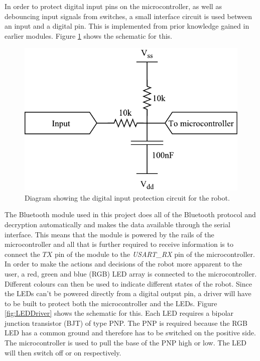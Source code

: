 In order to protect digital input pins on the microcontroller, as well as debouncing input signals from switches, a small interface circuit is used between an input and a digital pin. This is implemented from prior knowledge gained in earlier modules. Figure \ref{fig:InputProtection} shows the schematic for this.

\begin{figure}[H]
\centering
\includegraphics[scale = 1]{pics/InputProtection.pdf}
\caption{Diagram showing the digital input protection circuit for the robot.}
\label{fig:InputProtection}
\end{figure}

The Bluetooth module used in this project does all of the Bluetooth protocol and decryption automatically and makes the data available through the serial interface. This means that the module is powered by the rails of the microcontroller and all that is further required to receive information is to connect the $TX$ pin of the module to the \textit{USART\_RX} pin of the microcontroller.\\

In order to make the actions and decisions of the robot more apparent to the user, a red, green and blue (RGB) LED array is connected to the microcontroller. Different colours can then be used to indicate different states of the robot. Since the LEDs can't be powered directly from a digital output pin, a driver will have to be built to protect both the microcontroller and the LEDs. Figure \ref{fig:LEDDriver} shows the schematic for this. Each LED requires a bipolar junction transistor (BJT) of type PNP. The PNP is required because the RGB LED has a common ground and therefore has to be switched on the positive side. The microcontroller is used to pull the base of the PNP  high or low. The LED will then switch off or on respectively.

